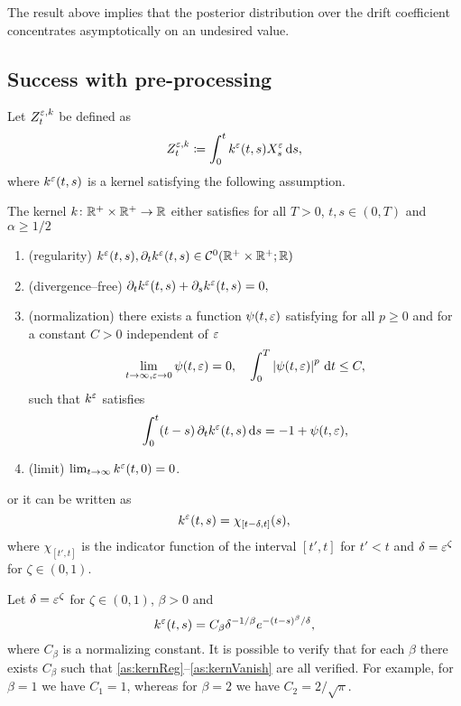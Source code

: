 \documentclass[10pt]{article}
\begin{document}
The result above implies that the posterior distribution over the drift coefficient concentrates asymptotically on an undesired value.

\subsection{Success with pre-processing}


Let $Z^{\varepsilon,k}_t$ be defined as
\begin{equation}
	Z^{\varepsilon,k}_t \coloneqq \int_0^t k^\varepsilon(t, s)X^\varepsilon_s \,\mathrm{d} s,
\end{equation}
where $k^\varepsilon(t, s)$ is a kernel satisfying the following assumption.
\begin{assumption} The kernel $k \colon \mathbb{R}^+ \times \mathbb{R}^+ \to \mathbb{R}$ either satisfies for all $T > 0$, $t, s \in (0, T)$ and $\alpha \geq 1/2$
\begin{enumerate}
	\item \label{as:kernReg} (regularity) $k^\varepsilon(t, s), \partial_t k^\varepsilon(t, s) \in \mathcal C^0(\mathbb{R}^+\times\mathbb{R}^+; \mathbb{R})$ 
	\item \label{as:kernDivFree} (divergence--free) $\partial_t k^\varepsilon(t, s) + \partial_s k^\varepsilon(t, s) = 0, $
	\item \label{as:kernNorm} (normalization) there exists a function $\psi(t, \varepsilon)$ satisfying for all $p \geq 0$ and for a constant $C > 0$ independent of $\varepsilon$
	\begin{equation}
		\lim_{t \to \infty, \varepsilon \to 0}\psi(t, \varepsilon) = 0, \quad \int_0^T \left\lvert\psi(t, \varepsilon)\right\rvert^p \,\mathrm{d} t \leq C,
	\end{equation}
	such that $k^\varepsilon$ satisfies
	\begin{equation}
		\int_0^t (t-s) \, \partial_t k^\varepsilon(t, s) \,\mathrm{d} s = -1 + \psi(t, \varepsilon),
	\end{equation}
	\item\label{as:kernVanish} (limit) $\lim_{t \to \infty} k^\varepsilon(t, 0) = 0$. 
\end{enumerate}	
or it can be written as
\begin{equation}
	k^\varepsilon(t,s) = \chi_{[t-\delta, t]}(s),
\end{equation}
where $\chi_{[t', t]}$ is the indicator function of the interval $[t', t]$ for $t' < t$ and $\delta = \varepsilon^\zeta$ for $\zeta \in (0, 1)$.
\end{assumption}

\begin{example} Let $\delta = \varepsilon^\zeta$ for $\zeta \in (0, 1)$, $\beta > 0$ and
	\begin{equation}
		k^\varepsilon(t, s) = C_{\beta} \delta^{-1/\beta} e^{-(t-s)^\beta/\delta},
	\end{equation}
	where $C_{\beta}$ is a normalizing constant. It is possible to verify that for each $\beta$ there exists $C_\beta$ such that \ref{as:kernReg}--\ref{as:kernVanish} are all verified. For example, for $\beta = 1$ we have $C_1 = 1$, whereas for $\beta = 2$ we have $C_2 = 2/\sqrt{\pi}$.
\end{example}
\end{document}
